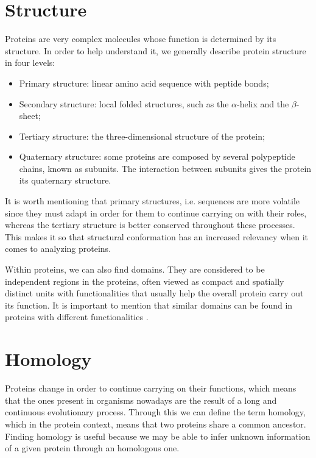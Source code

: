 \section{Structure}
Proteins are very complex molecules whose function is determined by its structure. In order to help understand it, we generally describe protein structure in four levels:

\begin{itemize}
	\item Primary structure: linear amino acid sequence with peptide bonds;
	\item Secondary structure: local folded structures, such as the $\alpha$-helix and the $\beta$-sheet;
	\item Tertiary structure: the three-dimensional structure of the protein;
	\item Quaternary structure: some proteins are composed by several polypeptide chains, known as subunits. The interaction between subunits gives the protein its quaternary structure.
\end{itemize}

It is worth mentioning that primary structures, i.e. sequences are more volatile since they must adapt in order for them to continue carrying on with their roles, whereas the tertiary structure is better conserved throughout these processes. This makes it so that structural conformation has an increased relevancy when it comes to analyzing proteins.

Within proteins, we can also find domains. They are considered to be independent regions in the proteins, often viewed as compact and spatially distinct units with functionalities that usually help the overall protein carry out its function. It is important to mention that similar domains can be found in proteins with different functionalities \cite{ponting2002natural}. 

\section{Homology}

Proteins change in order to continue carrying on their functions, which means that the ones present in organisms nowadays are the result of a long and continuous evolutionary process. Through this we can define the term homology, which in the protein context, means that two proteins share a common ancestor. Finding homology is useful because we may be able to infer unknown information of a given protein through an homologous one.

